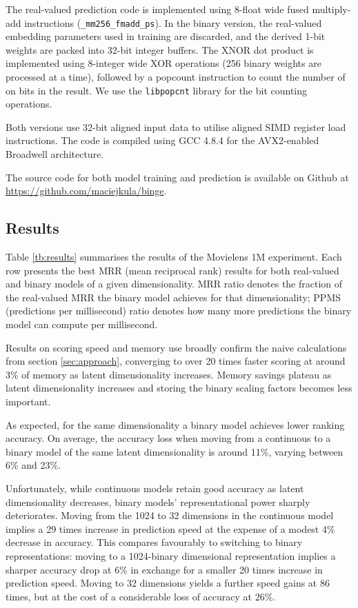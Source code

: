 \documentclass[sigchi]{acmart}
\begin{document}
The real-valued prediction code is implemented using 8-float wide fused multiply-add instructions (\texttt{\_mm256\_fmadd\_ps}). In the binary version, the real-valued embedding parameters used in training are discarded, and the derived 1-bit weights are packed into 32-bit integer buffers. The XNOR dot product is implemented using 8-integer wide XOR operations (256 binary weights are processed at a time), followed by a popcount instruction to count the number of on bits in the result. We use the \texttt{libpopcnt} \citep{mula2016faster} library for the bit counting operations.

Both versions use 32-bit aligned input data to utilise aligned SIMD register load instructions. The code is compiled using GCC 4.8.4 for the AVX2-enabled Broadwell architecture.

The source code for both model training and prediction is available on Github at \url{https://github.com/maciejkula/binge}.

\subsection{Results}
\label{sec:results}
Table \ref{tb:results} summarises the results of the Movielens 1M experiment. Each row presents the best MRR (mean reciprocal rank) results for both real-valued and binary models of a given dimensionality. MRR ratio denotes the fraction of the real-valued MRR the binary model achieves for that dimensionality; PPMS (predictions per millisecond) ratio denotes how many more predictions the binary model can compute per millisecond.

Results on scoring speed and memory use broadly confirm the naive calculations from section \ref{sec:approach}, converging to over 20 times faster scoring at around 3\% of memory as latent dimensionality increases. Memory savings plateau as latent dimensionality increases and storing the binary scaling factors becomes less important.

As expected, for the same dimensionality a binary model achieves lower ranking accuracy. On average, the accuracy loss when moving from a continuous to a binary model of the same latent dimensionality is around 11\%, varying between 6\% and 23\%.

Unfortunately, while continuous models retain good accuracy as latent dimensionality decreases, binary models' representational power sharply deteriorates. Moving from the 1024 to 32 dimensions in the continuous model implies a 29 times increase in prediction speed at the expense of a modest 4\% decrease in accuracy. This compares favourably to switching to binary representations: moving to a 1024-binary dimensional representation implies a sharper accuracy drop at 6\% in exchange for a smaller 20 times increase in prediction speed. Moving to 32 dimensions yields a further speed gains at 86 times, but at the cost of a considerable loss of accuracy at 26\%.
\end{document}
